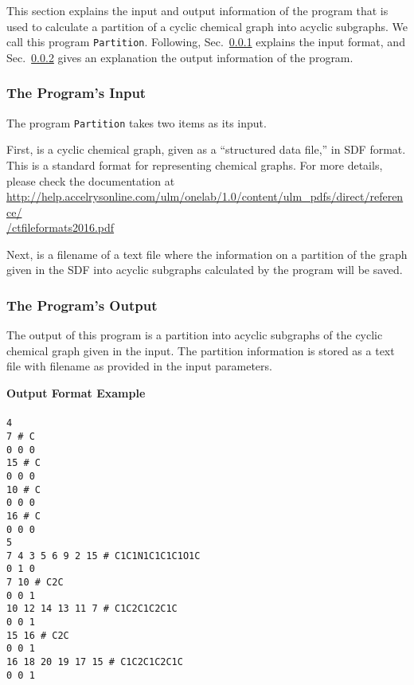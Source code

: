 \documentclass[11pt,titlepage,dvipdfmx,twoside]{article}
\begin{document}
This section explains the input and output information of the 
program that is used to calculate a partition of a cyclic chemical graph
into acyclic subgraphs.
We call this program {\tt Partition}.
Following,
Sec.~\ref{sec:Input_p} explains the input format, and
Sec.~\ref{sec:Output_p} gives an explanation the output information of the program.


\subsubsection{The Program's Input}
\label{sec:Input_p}


The program {\tt Partition} takes two items as its input.

First, is a cyclic chemical graph, given as a ``structured data file,'' in  SDF format.
This is a standard format for representing chemical graphs.
For more details, please check the documentation at \\
\url{ http://help.accelrysonline.com/ulm/onelab/1.0/content/ulm_pdfs/direct/reference/} \\
\url{/ctfileformats2016.pdf} 

Next,  is a filename of a text file where the information on 
a partition of the graph given in the SDF into acyclic subgraphs
calculated by the program will be saved.


\subsubsection{The Program's Output}
\label{sec:Output_p}

The output of this program is a 
partition into acyclic subgraphs of the cyclic chemical graph given in
the input.
The partition information is stored as a text file with filename as provided
in the input parameters.


\begin{oframed}
{\bf Output Format Example}\\\\
{\tt 4 \\
7 \# C \\
0 0 0 \\
15 \# C \\
0 0 0 \\
10 \# C \\
0 0 0 \\
16 \# C \\
0 0 0 \\
5 \\
7 4 3 5 6 9 2 15 \# C1C1N1C1C1C1O1C \\
0 1 0 \\
7 10 \# C2C \\
0 0 1 \\
10 12 14 13 11 7 \# C1C2C1C2C1C \\
0 0 1 \\
15 16 \# C2C \\
0 0 1 \\
16 18 20 19 17 15 \# C1C2C1C2C1C \\
0 0 1 \\}
\end{oframed}
\end{document}
